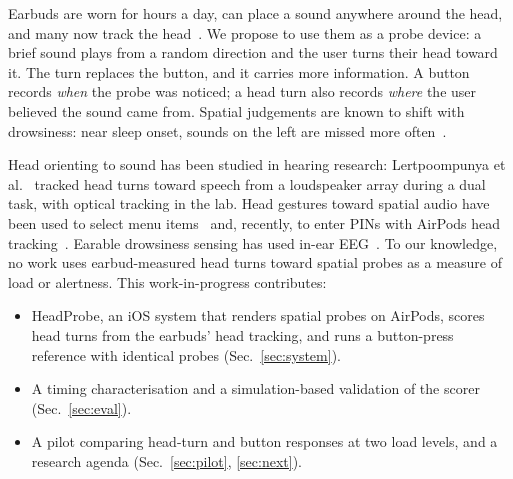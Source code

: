 \documentclass[conference,letterpaper]{IEEEtran}
\begin{document}
Earbuds are worn for hours a day, can place a sound anywhere around the head, and many now track the
head~\cite{roddiger2022sensing,apple2020headphonemotion}. We propose to use them as a probe device:
a brief sound plays from a random direction and the user turns their head toward it. The turn
replaces the button, and it carries more information. A button records \emph{when} the probe was
noticed; a head turn also records \emph{where} the user believed the sound came from. Spatial
judgements are known to shift with drowsiness: near sleep onset, sounds on the left are missed more
often~\cite{bareham2014losing}.

Head orienting to sound has been studied in hearing research: Lertpoompunya et
al.~\cite{lertpoompunya2024head} tracked head turns toward speech from a loudspeaker array during a
dual task, with optical tracking in the lab. Head gestures toward spatial audio have been used to
select menu items~\cite{brewster2003multimodal} and, recently, to enter PINs with AirPods head
tracking~\cite{naitou2026audiopin}. Earable drowsiness sensing has used in-ear EEG~\cite{kaveh2024wireless}.
To our knowledge, no work uses earbud-measured head turns toward spatial probes as a measure of load
or alertness. This work-in-progress contributes:
\begin{itemize}
\item HeadProbe, an iOS system that renders spatial probes on AirPods, scores head turns from the
  earbuds' head tracking, and runs a button-press reference with identical probes (Sec.~\ref{sec:system}).
\item A timing characterisation and a simulation-based validation of the scorer (Sec.~\ref{sec:eval}).
\item A pilot comparing head-turn and button responses at two load levels, and a research agenda
  (Sec.~\ref{sec:pilot}, \ref{sec:next}).
\end{itemize}
\end{document}
